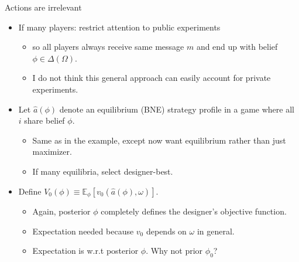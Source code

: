 \documentclass[english,10pt
,aspectratio=169
]{beamer}
\begin{document}
\begin{frame}{Actions are irrelevant}
\begin{itemize}
	\item If many players: restrict attention to \alert{public experiments}
	\begin{itemize}
		\item so all players always receive same message $m$ and end up with  belief $\phi \in \varDelta (\Omega)$.
		\item I do not think this general approach can easily account for private experiments.
	\end{itemize}
	\item Let $\hat{a}(\phi)$ denote an equilibrium (BNE) strategy profile in a game where all $i$ share belief $\phi$.
	\begin{itemize}
		\item Same as in the example, except now want equilibrium rather than just maximizer.
		\item If many equilibria, select designer-best.
	\end{itemize}
	\item Define $V_0 (\phi) \equiv \mathbb{E}_{\phi} \left[v_0 (\hat{a}(\phi), \omega)\right]$.
	\begin{itemize}
		\item Again, posterior $\phi$ completely defines the designer's objective function.
		\item Expectation needed because $v_0$ depends on $\omega$ in general.
		\item Expectation is w.r.t posterior $\phi$. Why not prior $\phi_0$?
	\end{itemize}
\end{itemize}
\end{frame}


\end{document}
